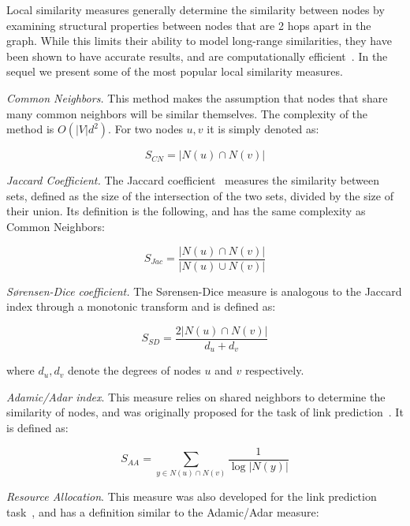 Local similarity measures generally determine the similarity between
nodes by examining structural properties between nodes that
are 2 hops apart in the graph. While this limits their ability to model long-range
similarities, they have been shown to have accurate results, and are computationally
efficient~\cite{link-prediction-survey}. In the sequel we present some of the most popular local similarity measures.


\emph{Common Neighbors.} This method makes the assumption that nodes that
share many common neighbors will be similar themselves. The complexity of
the method is $O(|V|d^2)$. For two nodes $u, v$
it is simply denoted as:

\begin{equation}
	S_{CN} = |N(u) \cap N(v)|
\end{equation}


\emph{Jaccard Coefficient.} The Jaccard coefficient~\cite{Jaccard1912} measures the similarity between
sets, defined as the size of the intersection of the two sets, divided by the size of their
union. Its definition is the following, and has the same complexity as Common Neighbors:

\begin{equation}
	S_{Jac} = \frac{|N(u) \cap N(v)|}{|N(u) \cup N(v)|}
\end{equation}

\emph{S{\o}rensen-Dice coefficient.} The S{\o}rensen-Dice measure \cite{Dice45,Sorensen48} is
analogous to the Jaccard index through a monotonic transform and is defined as:

\begin{equation}
	S_{SD} = \frac{2|N(u) \cap N(v)|}{d_u + d_v}
\end{equation}

\noindent
where $d_u, d_v$ denote the degrees of nodes $u$ and $v$ respectively.

\emph{Adamic/Adar index}. This measure relies on shared neighbors to determine
the similarity of nodes, and was originally proposed for the task of link
prediction~\cite{adamic-adar}. It is defined as:

\begin{equation}
	S_{AA} = \sum_{y \in N(u) \cap N(v)}{\frac{1}{\log{|N(y)|}}}
\end{equation}

\emph{Resource Allocation}. This measure was also developed for the
link prediction task~\cite{resource-allocation-sim}, and has a definition
similar to the Adamic/Adar measure:

